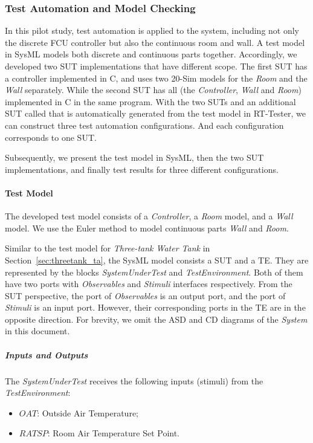 \subsubsection{Test Automation and Model Checking}
\label{sec:fcu_ta}
\graphicspath{ {./fcu/TA/} }
In this pilot study, test automation is applied to the system, including not only the discrete FCU controller but also the continuous room and wall. A test model in SysML models both discrete and continuous parts together. Accordingly, we developed two SUT implementations that have different scope. The first SUT has a controller implemented in C, and uses two 20-Sim models for the \emph{Room} and the \emph{Wall} separately. While the second SUT has all (the \emph{Controller}, \emph{Wall} and \emph{Room}) implemented in C in the same program. With the two SUTs and an additional SUT called  that is automatically generated from the test model in RT-Tester, we can construct three test automation configurations. And each configuration corresponds to one SUT.

Subsequently, we present the test model in SysML, then the two SUT implementations, and finally test results for three different configurations.

\paragraph{Test Model}
The developed test model consists of a \emph{Controller}, a \emph{Room} model, and a \emph{Wall} model. We use the Euler method to model continuous parts \emph{Wall} and \emph{Room}. 

Similar to the test model for \emph{Three-tank Water Tank} in Section~\ref{sec:threetank_ta}, the SysML model consists a SUT and a TE. They are represented by the blocks \emph{SystemUnderTest} and \emph{TestEnvironment}. Both of them have two ports with \emph{Observables} and \emph{Stimuli} interfaces respectively. From the SUT perspective, the port of
\emph{Observables} is an output port, and the port of \emph{Stimuli} is an input port. However, their corresponding ports in the TE are in the opposite direction. For brevity, we omit the ASD and CD diagrams of the \emph{System} in this document.

\subparagraph{Inputs and Outputs}
The \emph{SystemUnderTest} receives the following inputs (stimuli) from the \emph{TestEnvironment}:
\begin{itemize}
    \item $OAT$: Outside Air Temperature;
    \item $RATSP$: Room Air Temperature Set Point.
\end{itemize}

